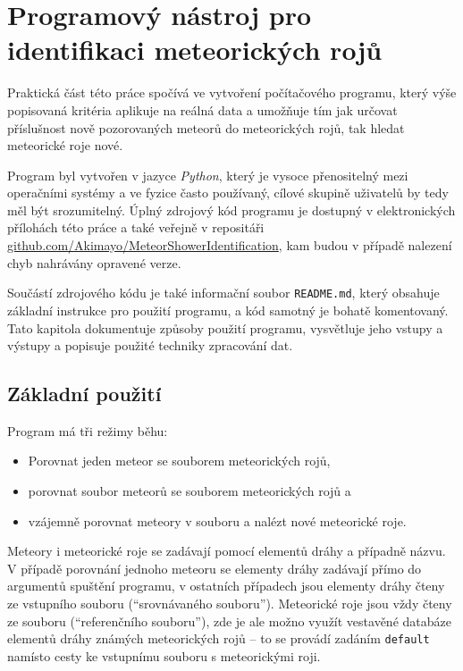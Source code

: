 \chapter{Programový nástroj pro identifikaci meteorických rojů\label{cpt:practical}}%
Praktická část této práce spočívá ve vytvoření počítačového programu, který výše popisovaná kritéria aplikuje na reálná data a umožňuje tím jak určovat příslušnost nově pozorovaných meteorů do meteorických rojů, tak hledat meteorické roje nové.

Program byl vytvořen v jazyce \textit{Python}, který je vysoce přenositelný mezi operačními systémy a ve fyzice často používaný, cílové skupině uživatelů by tedy měl být srozumitelný. Úplný zdrojový kód programu je dostupný v elektronických přílohách této práce a také veřejně v repositáři \\\href{https://github.com/Akimayo/MeteorShowerIdentification}{github.com/Akimayo/MeteorShowerIdentification}, kam budou v případě nalezení chyb nahrávány opravené verze.

Součástí zdrojového kódu je také informační soubor \texttt{README.md}, který obsahuje základní instrukce pro použití programu, a kód samotný je bohatě komentovaný. Tato kapitola dokumentuje způsoby použití programu, vysvětluje jeho vstupy a výstupy a popisuje použité techniky zpracování dat.

\section{Základní použití}%
Program má tři režimy běhu:
\begin{itemize}
    \item Porovnat jeden meteor se souborem meteorických rojů,
    \item porovnat soubor meteorů se souborem meteorických rojů a
    \item vzájemně porovnat meteory v souboru a nalézt nové meteorické roje.
\end{itemize}

Meteory i meteorické roje se zadávají pomocí elementů dráhy a případně názvu. V případě porovnání jednoho meteoru se elementy dráhy zadávají přímo do argumentů spuštění programu, v ostatních případech jsou elementy dráhy čteny ze vstupního souboru ("`srovnávaného souboru"'). Meteorické roje jsou vždy čteny ze souboru ("`referenčního souboru"'), zde je ale možno využít vestavěné databáze elementů dráhy známých meteorických rojů -- to se provádí zadáním \texttt{default} namísto cesty ke vstupnímu souboru s meteorickými roji.

